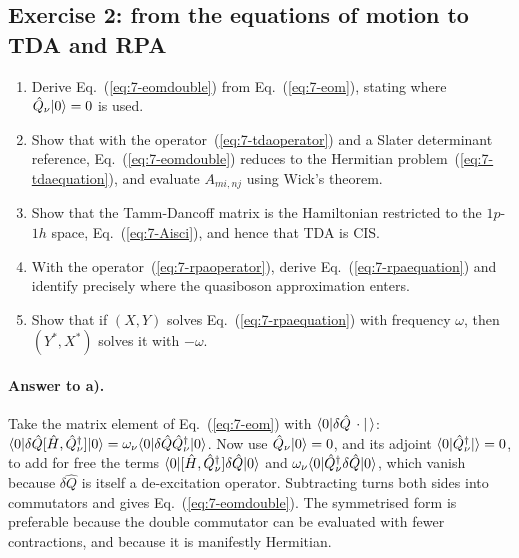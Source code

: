 \subsection*{Exercise 2: from the equations of motion to TDA and RPA}
\label{ex:7-eom}

\begin{enumerate}
  \item[a)] Derive Eq.~(\ref{eq:7-eomdouble}) from Eq.~(\ref{eq:7-eom}),
  stating where $\hat{Q}_{\nu}\vert 0 \rangle=0$ is used.
  \item[b)] Show that with the operator~(\ref{eq:7-tdaoperator}) and a Slater
  determinant reference, Eq.~(\ref{eq:7-eomdouble}) reduces to the Hermitian
  problem~(\ref{eq:7-tdaequation}), and evaluate
  $A_{mi,nj}$ using Wick's theorem.
  \item[c)] Show that the Tamm-Dancoff matrix is the Hamiltonian restricted
  to the $1p$-$1h$ space, Eq.~(\ref{eq:7-Aisci}), and hence that TDA is CIS.
  \item[d)] With the operator~(\ref{eq:7-rpaoperator}), derive
  Eq.~(\ref{eq:7-rpaequation}) and identify precisely where the quasiboson
  approximation enters.
  \item[e)] Show that if $(X,Y)$ solves Eq.~(\ref{eq:7-rpaequation}) with
  frequency $\omega$, then $(Y^{*},X^{*})$ solves it with $-\omega$.
\end{enumerate}

\paragraph{Answer to a).}
Take the matrix element of Eq.~(\ref{eq:7-eom}) with
$\langle 0 | \delta\hat{Q}\,\cdot | \, \rangle$:
$\langle 0 | \delta\hat{Q}[\hat{H},\hat{Q}^{\dagger}_{\nu}] | 0 \rangle
=\omega_{\nu}\langle 0 | \delta\hat{Q}\hat{Q}^{\dagger}_{\nu} | 0 \rangle$.
Now use $\hat{Q}_{\nu}\vert 0 \rangle=0$, and its adjoint
$\langle 0 | \hat{Q}^{\dagger}_{\nu} |  \rangle=0$, to add for free the terms
$\langle 0 | [\hat{H},\hat{Q}^{\dagger}_{\nu}]\delta\hat{Q} | 0 \rangle$ and
$\omega_{\nu}\langle 0 | \hat{Q}^{\dagger}_{\nu}\delta\hat{Q} | 0 \rangle$, which
vanish because $\delta\hat{Q}$ is itself a de-excitation operator.
Subtracting turns both sides into commutators and gives
Eq.~(\ref{eq:7-eomdouble}).  The symmetrised form is preferable because the
double commutator can be evaluated with fewer contractions, and because it is
manifestly Hermitian.

